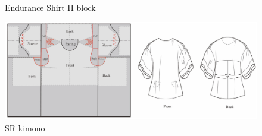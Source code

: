 \begin{figure} [H]
    \centering
    \caption{Endurance Shirt II block}
\end{figure}
\begin{figure} [H]
    \centering
    \includegraphics[width=\textwidth]{Images/SR kimono.png}
    \caption{SR kimono}
\end{figure}
